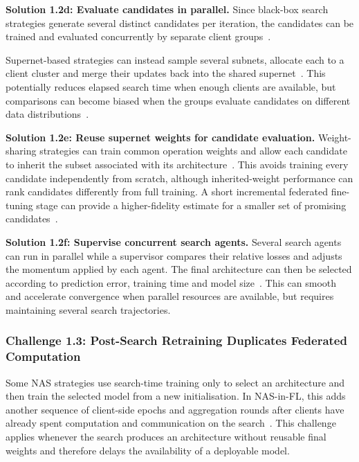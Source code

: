 \noindent\textbf{Solution 1.2d: Evaluate candidates in parallel.} Since black-box search strategies generate several distinct candidates per iteration, the candidates can be trained and evaluated concurrently by separate client groups~\cite{decnas_2022,rt_fed_evo_nas_2020,energy_fednas_2025}.

Supernet-based strategies can instead sample several subnets, allocate each to a client cluster and merge their updates back into the shared supernet~\cite{finch_2024}. This potentially reduces elapsed search time when enough clients are available, but comparisons can become biased when the groups evaluate candidates on different data distributions~\cite{decnas_2022}.

\noindent\textbf{Solution 1.2e: Reuse supernet weights for candidate evaluation.} Weight-sharing strategies can train common operation weights and allow each candidate to inherit the subset associated with its architecture~\cite{fl-agnns_2023,optimize_fednas_edge_2021}. This avoids training every candidate independently from scratch, although inherited-weight performance can rank candidates differently from full training. A short incremental federated fine-tuning stage can provide a higher-fidelity estimate for a smaller set of promising candidates~\cite{medical_image_segmentation_fednas_2024}.

\noindent\textbf{Solution 1.2f: Supervise concurrent search agents.} Several search agents can run in parallel while a supervisor compares their relative losses and adjusts the momentum applied by each agent. The final architecture can then be selected according to prediction error, training time and model size~\cite{supervised_fednas_2023}. This can smooth and accelerate convergence when parallel resources are available, but requires maintaining several search trajectories.

\subsubsection{Challenge 1.3: Post-Search Retraining Duplicates Federated Computation}

Some NAS strategies use search-time training only to select an architecture and then train the selected model from a new initialisation. In NAS-in-FL, this adds another sequence of client-side epochs and aggregation rounds after clients have already spent computation and communication on the search~\cite{medical_image_segmentation_fednas_2024,privacy_preserving_fednas_for_edge_2025}. This challenge applies whenever the search produces an architecture without reusable final weights and therefore delays the availability of a deployable model.

